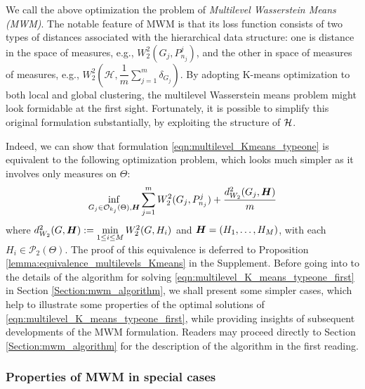 We call the above optimization the problem of \emph{Multilevel Wasserstein Means (MWM)}. 
The notable feature of MWM is that its loss function consists of two types of distances 
associated with the hierarchical data structure:
one is distance in the space of measures, e.g., $W_{2}^{2}(G_{j},P_{n_{j}}^{j})$, 
and the other in space of measures of measures, e.g., 
$W_{2}^{2}(\mathcal{H},\dfrac{1}{m}\mathop {\sum }\limits_{j=1}^{m}{\delta_{G_{j}}})$. By 
adopting K-means optimization to both local and global clustering, the multilevel Wasserstein means 
problem might look formidable at the first sight. 
Fortunately, it is possible to simplify this original formulation substantially,
by exploiting the structure of $\mathcal{H}$.

Indeed, we can show that formulation \eqref{eqn:multilevel_Kmeans_typeone} is
equivalent to the following optimization problem, which looks much simpler as
it involves only measures on $\Theta$:
\begin{eqnarray}
\mathop {\inf }\limits_{G_{j} \in \mathcal{O}_{k_{j}}(\Theta), \boldsymbol{H}}
{\mathop {\sum }\limits_{j=1}^{m}{W_{2}^{2}(G_{j},P_{n_{j}}^{j})}+\dfrac{d_{W_{2}}^{2}(G_{j},\boldsymbol{H})}{m}} \label{eqn:multilevel_K_means_typeone_first}
\end{eqnarray}
where $d_{W_{2}}^{2}(G,\boldsymbol{H}) := \mathop {\min } \limits_{1 \leq i \leq M}{W_{2}^{2}(G,H_{i})}$ and $\boldsymbol{H}=(H_{1},\ldots,H_{M})$,
with each $H_i \in \mathcal{P}_2(\Theta)$. The proof of this 
equivalence is deferred to Proposition \ref{lemma:equivalence_multilevels_Kmeans} in the Supplement. 
Before going into to the details of the algorithm for solving 
\eqref{eqn:multilevel_K_means_typeone_first}
in Section \ref{Section:mwm_algorithm}, we shall present some simpler cases,
which help to illustrate some properties of the optimal solutions of 
\eqref{eqn:multilevel_K_means_typeone_first},
while providing insights of subsequent developments of the MWM formulation.
Readers may proceed directly to Section \ref{Section:mwm_algorithm} 
for the description of the algorithm in the first reading.
%
%
%
%
\subsubsection{Properties of MWM in special cases} \label{Section:mwm_specical_cases}
